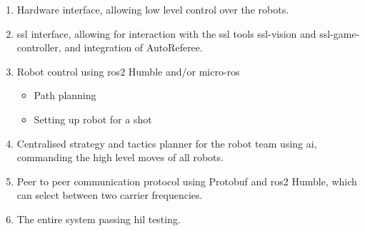 \begin{enumerate}
    \item Hardware interface, allowing low level control over the robots.
    \item \ac{ssl} interface, allowing for interaction with the \ac{ssl} tools ssl-vision and ssl-game-controller, and integration of AutoReferee.
    \item Robot control using \ac{ros2} Humble and/or micro-\acs{ros}
    \begin{itemize}
        \item Path planning
        \item Setting up robot for a shot
    \end{itemize}
    \item Centralised strategy and tactics planner for the robot team using \ac{ai}, commanding the high level moves of all robots.
    \item Peer to peer communication protocol using Protobuf and \ac{ros2} Humble, which can select between two carrier frequencies. 
    \item The entire system passing \ac{hil} testing.
\end{enumerate}

